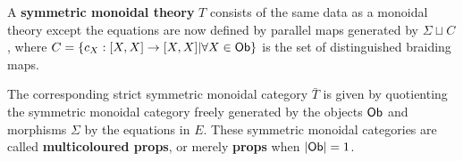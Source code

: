 \begin{definition}

A {\bf symmetric monoidal theory} $T$ consists of the same data as a monoidal theory except the equations are now defined by parallel maps generated by $\Sigma\sqcup C$, where  $C=\{c_X:[X,X]\to [X,X]|\forall X \in {\sf Ob}\}$ is the set of distinguished braiding maps.


The corresponding strict symmetric monoidal category $\bar T$ is given by quotienting the symmetric monoidal category freely generated by the objects $\sf Ob$ and morphisms $\Sigma$ by the equations in $E$.  These symmetric monoidal categories are called {\bf multicoloured props}, or merely {\bf props} when $|{\sf Ob}|=1$.
\end{definition}






